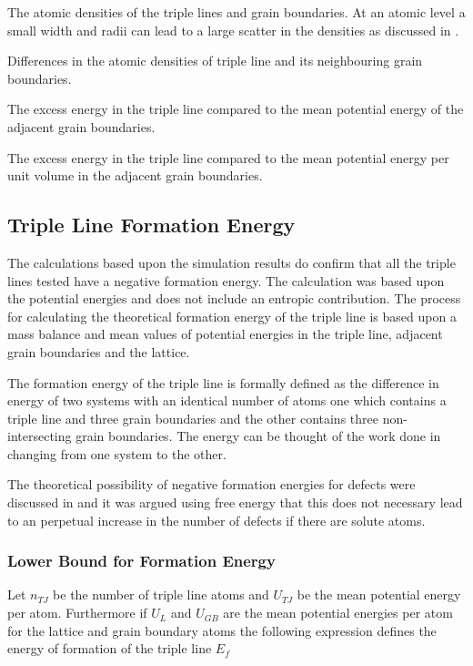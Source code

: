 \documentclass[12pt,a4paper]{book}
\begin{document}
The atomic densities of the triple lines and grain boundaries.
At an atomic level a small width and radii can lead to a large scatter in the densities as discussed in \cite{Kamachali2019}.  


Differences in the atomic densities of triple line and its neighbouring grain boundaries.

The excess energy in the triple line compared to the mean potential energy of the adjacent grain boundaries.

The excess energy in the triple line compared to the mean potential energy per unit volume in the adjacent grain boundaries. 



\subsection{Triple Line Formation Energy}

The calculations based upon the simulation results do confirm that all the triple lines tested have a negative formation energy. The calculation was based upon the potential energies and does not include an entropic contribution. The process for calculating the theoretical formation energy of the triple line is based upon a mass balance and mean values of potential energies in the triple line, adjacent grain boundaries and the lattice.

The formation energy of the triple line is formally defined as the difference in energy of two systems with an identical number of atoms one which contains a triple line and three grain boundaries and the other contains three non-intersecting grain boundaries. The energy can be thought of the work done in changing from one system to the other.

The theoretical possibility of negative formation energies for defects were discussed in \cite{KIRCHHEIM20075129} and it was argued using free energy that this does not necessary lead to an perpetual increase in the number of defects if there are solute atoms.  

\subsubsection{Lower Bound for Formation Energy}

Let $n_{TJ}$ be the number of triple line atoms and $U_{TJ}$ be the mean potential energy per atom. Furthermore if $U_{L}$ and $U_{GB}$ are the mean potential energies per atom for the lattice and grain boundary atoms the following expression defines the energy of formation of the triple line $E_{f}$
\end{document}
